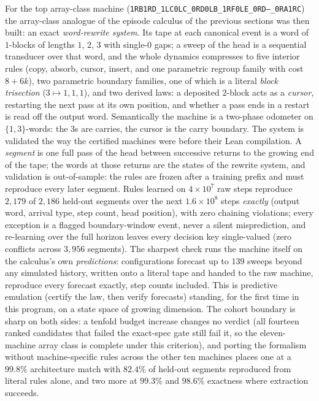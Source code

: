 \documentclass[11pt]{article}
\begin{document}
For the top array-class machine
(\texttt{1RB1RD\_1LC0LC\_0RD0LB\_1RF0LE\_0RD---\_0RA1RC}) the
array-class analogue of the episode calculus of the previous
sections was then built: an exact
\emph{word-rewrite system}. Its tape at each canonical event is a
word of $1$-blocks of lengths $1$, $2$, $3$ with single-$0$ gaps; a
sweep of the head is a sequential transducer over that word, and the
whole dynamics compresses to five interior rules (copy, absorb,
cursor, insert, and one parametric regroup family with cost $8+6k$),
two parametric boundary families, one of which is a literal
\emph{block trisection} ($3 \mapsto 1{,}1{,}1$), and two derived
laws: a deposited $2$-block acts as a \emph{cursor}, restarting the
next pass at its own position, and whether a pass ends in a restart
is read off the output word. Semantically the machine is a two-phase
odometer on $\{1,3\}$-words: the $3$s are carries, the cursor is the
carry boundary. The system is validated the way the certified
machines were before their Lean compilation. A \emph{segment} is
one full pass of the head between successive returns to the growing
end of the tape; the words at those returns are the states of the
rewrite system, and validation is out-of-sample: the rules are
frozen after a training prefix and must reproduce every later
segment. Rules learned on
$4 \times 10^{7}$ raw steps reproduce $2{,}179$ of $2{,}186$
held-out segments over the next $1.6 \times 10^{8}$ steps
\emph{exactly} (output word, arrival type, step count, head
position), with zero chaining violations; every exception is a
flagged boundary-window event, never a silent misprediction, and
re-learning over the full horizon leaves every decision key
single-valued (zero conflicts across $3{,}956$ segments).
The sharpest check runs the machine itself on the calculus's own
\emph{predictions}: configurations forecast up to $139$ sweeps
beyond any simulated history, written onto a literal tape and
handed to the raw machine, reproduce every forecast exactly, step
counts included. This is predictive emulation (certify the law, then
verify forecasts) standing, for the first time in this program,
on a state space of growing dimension. The cohort boundary is
sharp on both sides: a tenfold budget increase changes no verdict
(all fourteen ranked candidates that failed the exact-spec gate
still fail it, so the eleven-machine array class is complete under
this criterion), and porting the formalism without machine-specific
rules across the other ten machines places one at a $99.8\%$
architecture match with $82.4\%$ of held-out segments reproduced
from literal rules alone, and two more at $99.3\%$ and $98.6\%$
exactness where extraction succeeds.
\end{document}
